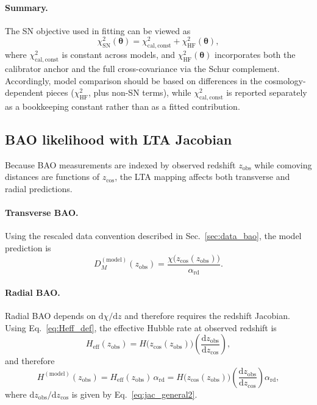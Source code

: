 \documentclass[10pt]{article}
\newcommand{\zobs}{z_{\mathrm{obs}}}
\newcommand{\zcos}{z_{\mathrm{cos}}}
\newcommand{\Hc}{H}
\newcommand{\chis}{\chi}
\providecommand{\dd}{\mathrm{d}}
\begin{document}
\paragraph{Summary.}
The SN objective used in fitting can be viewed as
\begin{equation}
\chi^2_{\mathrm{SN}}(\bm{\theta}) = \chi^2_{\mathrm{cal,const}} + \chi^2_{\mathrm{HF}}(\bm{\theta}),
\end{equation}
where $\chi^2_{\mathrm{cal,const}}$ is constant across models, and $\chi^2_{\mathrm{HF}}(\bm{\theta})$ incorporates both the calibrator anchor and the full cross-covariance via the Schur complement.
Accordingly, model comparison should be based on differences in the cosmology-dependent pieces
(\(\chi^2_{\mathrm{HF}}\), plus non-SN terms), while \(\chi^2_{\mathrm{cal,const}}\) is reported
separately as a bookkeeping constant rather than as a fitted contribution.

\subsection{BAO likelihood with LTA Jacobian}
\label{sec:bao_like}

Because BAO measurements are indexed by observed redshift $\zobs$ while comoving distances are functions of $\zcos$, the LTA mapping affects both transverse and radial predictions.

\paragraph{Transverse BAO.}
Using the rescaled data convention described in Sec.~\ref{sec:data_bao}, the model prediction is
\begin{equation}
D_M^{(\mathrm{model})}(\zobs) =
\frac{\chis\!\bigl(\zcos(\zobs)\bigr)}{\alpha_{\mathrm{rd}}}.
\label{eq:bao_DM_model}
\end{equation}

\paragraph{Radial BAO.}
Radial BAO depends on $\dd\chis/\dd z$ and therefore requires the redshift Jacobian. Using Eq.~\eqref{eq:Heff_def}, the effective Hubble rate at observed redshift is
\begin{equation}
H_{\mathrm{eff}}(\zobs) =
\Hc\!\bigl(\zcos(\zobs)\bigr)\left(\frac{\dd \zobs}{\dd \zcos}\right),
\end{equation}
and therefore
\begin{equation}
H^{(\mathrm{model})}(\zobs) = H_{\mathrm{eff}}(\zobs)\,\alpha_{\mathrm{rd}}
= \Hc\!\bigl(\zcos(\zobs)\bigr)\left(\frac{\dd \zobs}{\dd \zcos}\right)\alpha_{\mathrm{rd}},
\label{eq:bao_H_model}
\end{equation}
where $\dd \zobs/\dd \zcos$ is given by Eq.~\eqref{eq:jac_general2}.
\end{document}
